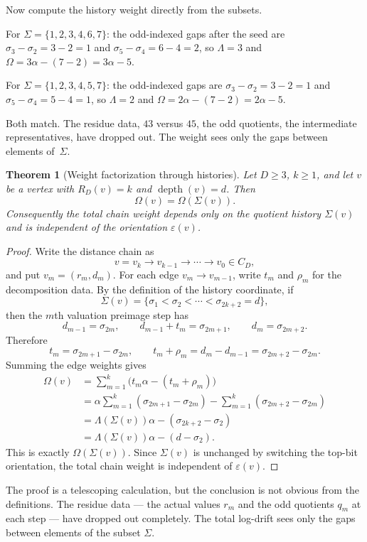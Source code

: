 \documentclass[11pt]{amsart}
\newtheorem{theorem}{Theorem}[section]
\theoremstyle{definition}
\theoremstyle{remark}
\newcommand{\depth}{\operatorname{depth}}
\newcommand{\eps}{\varepsilon}
\begin{document}
Now compute the history weight directly from the subsets.

For $\Sigma=\{1,2,3,4,6,7\}$: the odd-indexed gaps after the seed are $\sigma_3-\sigma_2=3-2=1$ and $\sigma_5-\sigma_4=6-4=2$, so $\Lambda=3$ and $\Omega=3\alpha-(7-2)=3\alpha-5$.

For $\Sigma=\{1,2,3,4,5,7\}$: the odd-indexed gaps are $\sigma_3-\sigma_2=3-2=1$ and $\sigma_5-\sigma_4=5-4=1$, so $\Lambda=2$ and $\Omega=2\alpha-(7-2)=2\alpha-5$.

Both match.  The residue data, $43$ versus $45$, the odd quotients, the intermediate representatives, have dropped out.  The weight sees only the gaps between elements of~$\Sigma$.

\begin{theorem}[Weight factorization through histories]\label{thm:weightfactor}
Let $D\ge3$, $k\ge1$, and let $v$ be a vertex with $R_D(v)=k$ and $\depth(v)=d$.  Then
\[
\Omega(v)=\Omega(\Sigma(v)).
\]
Consequently the total chain weight depends only on the quotient history $\Sigma(v)$ and is independent of the orientation $\eps(v)$.
\end{theorem}

\begin{proof}
Write the distance chain as
\[
v=v_k\to v_{k-1}\to\cdots\to v_0\in C_D,
\]
and put $v_m=(r_m,d_m)$.  For each edge $v_m\to v_{m-1}$, write $t_m$ and $\rho_m$ for the decomposition data.  By the definition of the history coordinate, if
\[
\Sigma(v)=\{\sigma_1<\sigma_2<\cdots<\sigma_{2k+2}=d\},
\]
then the $m$th valuation preimage step has
\[
d_{m-1}=\sigma_{2m},\qquad d_{m-1}+t_m=\sigma_{2m+1},\qquad d_m=\sigma_{2m+2}.
\]
Therefore
\[
t_m=\sigma_{2m+1}-\sigma_{2m},
\qquad
 t_m+\rho_m=d_m-d_{m-1}=\sigma_{2m+2}-\sigma_{2m}.
\]
Summing the edge weights gives
\begin{align*}
\Omega(v)
&=\sum_{m=1}^k\bigl(t_m\alpha-(t_m+\rho_m)\bigr)\\
&=\alpha\sum_{m=1}^k(\sigma_{2m+1}-\sigma_{2m})
  -\sum_{m=1}^k(\sigma_{2m+2}-\sigma_{2m})\\
&=\Lambda(\Sigma(v))\alpha-(\sigma_{2k+2}-\sigma_2)\\
&=\Lambda(\Sigma(v))\alpha-(d-\sigma_2).
\end{align*}
This is exactly $\Omega(\Sigma(v))$.  Since $\Sigma(v)$ is unchanged by switching the top-bit orientation, the total chain weight is independent of $\eps(v)$.
\end{proof}

The proof is a telescoping calculation, but the conclusion is not obvious from the definitions.  The residue data — the actual values $r_m$ and the odd quotients $q_m$ at each step — have dropped out completely.  The total log-drift sees only the gaps between elements of the subset $\Sigma$.
\end{document}
